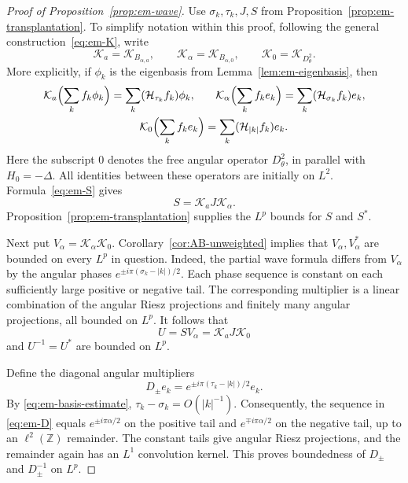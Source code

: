\documentclass[11pt,a4paper,reqno,backref=page]{amsart}
\newcommand{\Z}{\mathbb Z}
\newcommand{\HH}{\mathcal H}                 %
\numberwithin{equation}{section}
\theoremstyle{definition}
\theoremstyle{remark}
\begin{document}
\begin{proof}[Proof of Proposition~\ref{prop:em-wave}]
  Use $\sigma_k,\tau_k,J,S$ from
  Proposition~\ref{prop:em-transplantation}.
  To simplify notation within this proof,
  following the general construction~\eqref{eq:em-K}, write
  \begin{equation*}
    \mathcal K_a=\mathcal K_{B_{\alpha,a}},\qquad
    \mathcal K_\alpha=\mathcal K_{B_{\alpha,0}},\qquad
    \mathcal K_0=\mathcal K_{D_\theta^2}.
  \end{equation*}
  More explicitly, if $\phi_k$ is the eigenbasis from
  Lemma~\ref{lem:em-eigenbasis}, then
  \begin{equation*}
    \begin{aligned}
      \mathcal K_a\Bigl(\sum_k f_k\phi_k\Bigr)
        =\sum_k(\HH_{\tau_k}f_k)\phi_k,\quad & \quad
      \mathcal K_\alpha\Bigl(\sum_k f_ke_k\Bigr)
        =\sum_k(\HH_{\sigma_k}f_k)e_k,\\
      \mathcal K_0\Bigl(\sum_k f_ke_k\Bigr)
        &=\sum_k(\HH_{|k|}f_k)e_k.
    \end{aligned}
  \end{equation*}
  Here the subscript $0$ denotes the free angular operator
  $D_\theta^2$, in parallel with $H_0=-\Delta$.
  All identities between these operators are initially on
  $L^2$. Formula~\eqref{eq:em-S} gives
  \begin{equation*}
    S=\mathcal K_aJ\mathcal K_\alpha.
  \end{equation*}
  Proposition~\ref{prop:em-transplantation} supplies the
  $L^p$ bounds for $S$ and $S^*$.

  Next put $V_\alpha=\mathcal K_\alpha\mathcal K_0$.
  Corollary~\ref{cor:AB-unweighted} implies that
  $V_\alpha,V_\alpha^*$ are bounded on every $L^p$ in
  question. Indeed, the partial wave formula differs from
  $V_\alpha$ by the angular phases
  $e^{\pm i\pi(\sigma_k-|k|)/2}$. Each phase sequence is
  constant on each sufficiently large positive or negative
  tail. The corresponding multiplier is a linear combination
  of the angular Riesz projections and finitely many angular
  projections, all bounded on $L^p$. It follows that
  \begin{equation}\label{eq:em-U}
    U=SV_\alpha=\mathcal K_aJ\mathcal K_0
  \end{equation}
  and $U^{-1}=U^*$ are bounded on $L^p$.

  Define the diagonal angular multipliers
  \begin{equation}\label{eq:em-D}
    D_\pm e_k
    =e^{\pm i\pi(\tau_k-|k|)/2}e_k.
  \end{equation}
  By \eqref{eq:em-basis-estimate},
  $\tau_k-\sigma_k=O(|k|^{-1})$. Consequently, the sequence
  in \eqref{eq:em-D} equals
  $e^{\pm i\pi\alpha/2}$ on the positive tail and
  $e^{\mp i\pi\alpha/2}$ on the negative tail, up to an
  $\ell^2(\Z)$ remainder. The constant tails give angular
  Riesz projections, and the remainder again has an $L^1$
  convolution kernel. This proves boundedness of $D_\pm$
  and $D_\pm^{-1}$ on $L^p$.


\end{proof}
\end{document}
